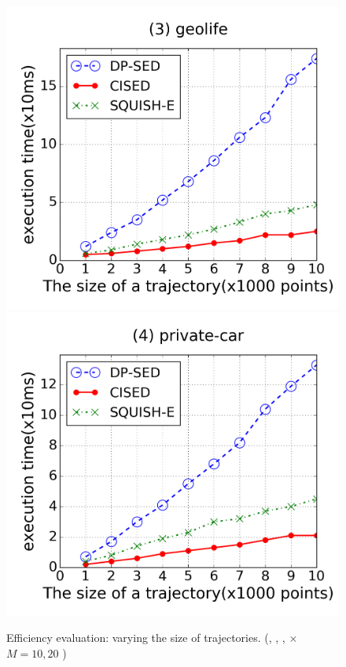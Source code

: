 \begin{figure}[tb!]
\includegraphics[scale = 0.25]{figures/Exp-time-size-geolife.png}
\includegraphics[scale = 0.25]{figures/Exp-time-size-private.png}
\vspace{-3ex}
\caption{\small Efficiency evaluation: varying the size of trajectories. (\cist, \cista, \dpa, \squishe  $\times$ $M = 10, {20}$ )}
\label{fig:time-size}
\vspace{-1ex}
\end{figure}

